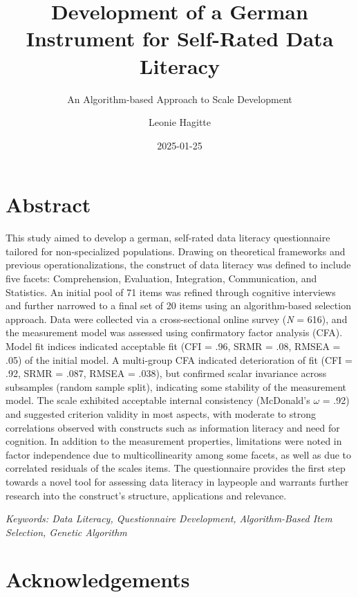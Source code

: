 \documentclass[
  12pt,
  a4paper,
  twoside]{article}
\title{Development of a German Instrument for Self-Rated Data Literacy}
\subtitle{An Algorithm-based Approach to Scale Development}
\author{Leonie Hagitte}
\date{2025-01-25}
\begin{document}
\maketitle

{
\setcounter{tocdepth}{2}
\tableofcontents
}
\newpage\null\thispagestyle{empty}\newpage

\section*{Abstract}\label{abstract}

This study aimed to develop a german, self-rated data literacy questionnaire tailored for non-specialized populations. Drawing on theoretical frameworks and previous operationalizations, the construct of data literacy was defined to include five facets: Comprehension, Evaluation, Integration, Communication, and Statistics. An initial pool of 71 items was refined through cognitive interviews and further narrowed to a final set of 20 items using an algorithm-based selection approach. Data were collected via a cross-sectional online survey (\emph{N} = 616), and the measurement model was assessed using confirmatory factor analysis (CFA). Model fit indices indicated acceptable fit (CFI = .96, SRMR = .08, RMSEA = .05) of the initial model. A multi-group CFA indicated deterioration of fit (CFI = .92, SRMR = .087, RMSEA = .038), but confirmed scalar invariance across subsamples (random sample split), indicating some stability of the measurement model. The scale exhibited acceptable internal consistency (McDonald's \(\omega\) = .92) and suggested criterion validity in most aspects, with moderate to strong correlations observed with constructs such as information literacy and need for cognition. In addition to the measurement properties, limitations were noted in factor independence due to multicollinearity among some facets, as well as due to correlated residuals of the scales items. The questionnaire provides the first step towards a novel tool for assessing data literacy in laypeople and warrants further research into the construct's structure, applications and relevance.

\emph{Keywords: Data Literacy, Questionnaire Development, Algorithm-Based Item Selection, Genetic Algorithm}

\section*{Acknowledgements}\label{acknowledgements}
\end{document}
